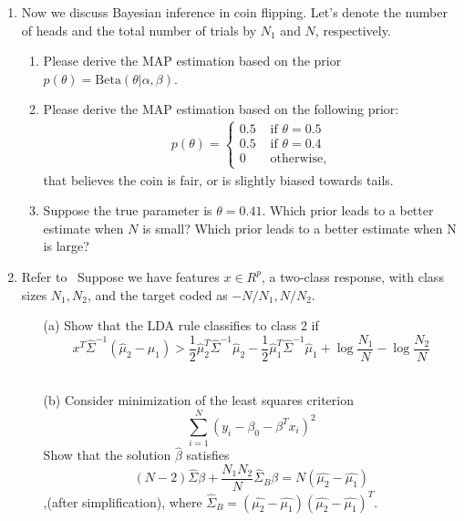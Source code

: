 \documentclass[10pt]{article}
\begin{document}
\begin{enumerate}[1.]
                \item Now we discuss Bayesian inference in coin flipping.  
                Let's denote the number of heads and the total number of trials by $N_1$ and $N$, respectively. 
		\begin{enumerate}
			\item Please derive the MAP estimation based on the prior $p(\theta) = \text{Beta}(\theta|\alpha, \beta)$.~
			\item Please derive the MAP estimation based on the following prior:
			\begin{align*}
				p(\theta)=\left\{\begin{array}{ll}
0.5 & \text { if } \theta=0.5 \\
0.5 & \text { if } \theta=0.4 \\
0 & \text { otherwise,}
\end{array}\right.
            \end{align*}
            that believes the coin is fair, or is slightly biased towards tails. ~
        \item Suppose the true parameter is $\theta = 0.41$. 
        Which prior leads to a better estimate when $N$ is small?
        Which prior leads to a better estimate when N is large? ~
		\end{enumerate}
        


        \iffalse
        \item  Refer to~\cite[Ex. 4.2]{hastie2009elements}
        Suppose we have features $x \in R^p$, a two-class response, with class
sizes $N_1,N_2$, and the target coded as $−N/N_1,N/N_2$.
        \begin{itemize}
        	\item[(a)] Show that the LDA rule classifies to class 2 if
            $$x^T \hat \Sigma^{-1} (\hat \mu_2 - \hat \mu_1) > \frac{1}{2} \hat \mu_2^T \hat \Sigma^{-1} \hat \mu_2 - \frac{1}{2} \hat \mu_1^T \hat \Sigma^{-1} \hat \mu_1 + \log \frac{N_1}{N} - \log \frac{N_2}{N}$$ ~
        	
        	\item[(b)] Consider minimization of the least squares criterion 
            $$
                \sum_{i=1}^{N}(y_i-\beta_0-\beta^Tx_i)^2
            $$
            Show that the solution $\hat\beta$ satisfies
            $$
                (N-2)\hat{\Sigma}\beta + \dfrac{N_1N_2}{N}\hat\Sigma_B\beta=N(\hat{\mu_2}-\hat{\mu_1})
            $$
        ,(after simplification), where $\hat\Sigma_B = (\hat{\mu_2}-\hat{\mu_1})(\hat{\mu_2}-\hat{\mu_1})^T$. ~
        	

\end{itemize}
\end{enumerate}
\end{document}
